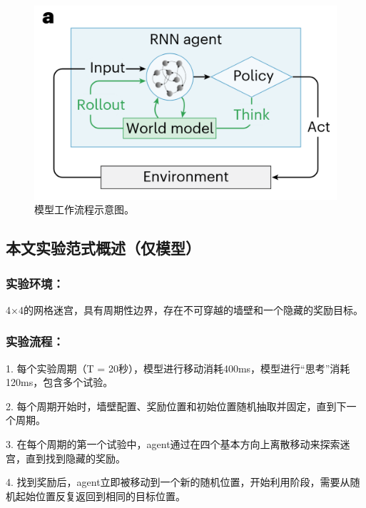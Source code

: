 \documentclass[UTF8,12pt]{article} %
\begin{document}
\begin{figure}[H]
	\center
	\includegraphics[scale=0.2]{figs/fig2.png}
	\centering
	\caption{模型工作流程示意图。}\label{fig:fig2}
\end{figure}

\subsection{本文实验范式概述（仅模型）}
\subsubsection{实验环境：} 
4×4的网格迷宫，具有周期性边界，存在不可穿越的墙壁和一个隐藏的奖励目标。

\subsubsection{实验流程：}
1. 每个实验周期（T = 20秒），模型进行移动消耗400ms，模型进行“思考”消耗120ms，包含多个试验。

2. 每个周期开始时，墙壁配置、奖励位置和初始位置随机抽取并固定，直到下一个周期。

3. 在每个周期的第一个试验中，agent通过在四个基本方向上离散移动来探索迷宫，直到找到隐藏的奖励。

4. 找到奖励后，agent立即被移动到一个新的随机位置，开始利用阶段，需要从随机起始位置反复返回到相同的目标位置。
\end{document}
